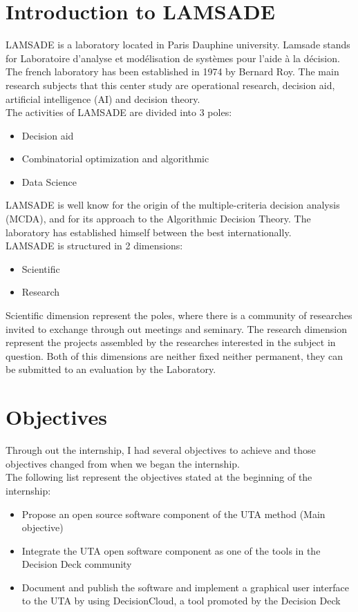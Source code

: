 \documentclass{report}
\begin{document}
\section{Introduction to LAMSADE}
LAMSADE is a laboratory located in Paris Dauphine university. Lamsade stands for Laboratoire d'analyse et modélisation de systèmes pour l'aide à la décision. The french laboratory has been established in 1974 by Bernard Roy. The main research subjects that this center study are  operational research, decision aid, artificial intelligence (AI) and decision theory. \\
The activities of LAMSADE are divided into 3 poles: 
\begin{itemize}
\item Decision aid 
\item Combinatorial optimization and algorithmic
\item Data Science
\end{itemize}
LAMSADE is well know for the origin of the multiple-criteria decision analysis (MCDA), and for its approach to the Algorithmic Decision Theory. The laboratory has established himself between the best internationally. \\
LAMSADE is structured in 2 dimensions:
\begin{itemize}
\item Scientific 
\item Research
\end{itemize}
Scientific dimension represent the poles, where there is a community of researches invited to exchange through out meetings and seminary. The research dimension represent the projects assembled by the researches interested in the subject in question. Both of this dimensions are neither fixed neither permanent, they can be submitted to an evaluation by the Laboratory. 

\section{Objectives}
Through out the internship, I had several objectives to achieve and those objectives changed from when we began the internship. \\
The following list represent the objectives stated at the beginning of the internship: 
\begin{itemize}
\item Propose an open source software component of the UTA method (Main objective)
\item Integrate the UTA open software component as one of the tools in the Decision Deck community
\item Document and publish the software and implement a graphical user interface to the UTA by using DecisionCloud, a tool promoted by the Decision Deck
\end{itemize}
\end{document}
